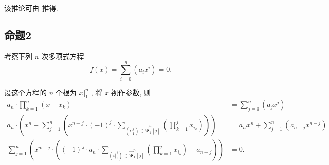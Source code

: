 \documentclass{article}
\renewcommand\.{.\hspace{3pt}}
\renewcommand\,{,\hspace{4pt}}
\renewcommand\:{:\hspace{3pt}}
\begin{document}
	该推论可由 \underline{}推得\.
	
	\subsection{命题2} \label{sec:3.3}
	考察下列 $n$ 次多项式方程
	\begin{equation}
		f(x) = \sum_{i=0}^{n} \left( a_{i} x^{i} \right) = 0 \.
	\end{equation}
	
	设这个方程的 $n$ 个根为 $x |_{1}^{n}$ \, 将 $x$ 视作参数\, 则
	\begin{align*}
		a_{n} \cdot \prod_{k=1}^{n} \left( x - x_{k} \right) & = \sum_{j=0}^{n} \left( a_{j} x^{j} \right) \\
		a_{n} \cdot \left( x^{n} + \sum_{j=1}^{n} \left( x^{n-j} \cdot \left( -1 \right)^{j} \cdot \sum_{\left( i |_{1}^{j} \right) \in \bm{\vec{\Psi}}_{1}^{n} \left[ j \right]} \left( \prod_{k=1}^{j} x_{i_{k}} \right) \right) \right) & = a_{n} x^{n} + \sum_{j=1}^{n} \left( a_{n-j} x^{n-j} \right) \\
		\sum_{j=1}^{n} \left( x^{n-j} \cdot \left( \left( -1 \right)^{j} \cdot a_{n} \cdot \sum_{\left( i |_{1}^{j} \right) \in \bm{\vec{\Psi}}_{1}^{n} \left[ j \right]} \left( \prod_{k=1}^{j} x_{i_{k}} \right) - a_{n-j} \right) \right) & = 0 \.
	\end{align*}
	
\end{document}
